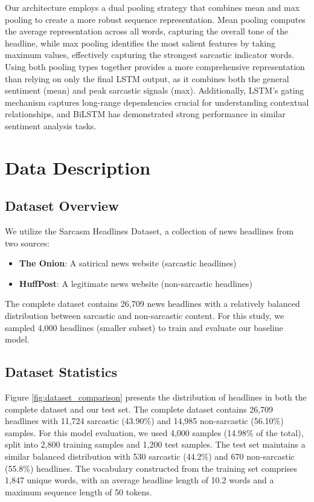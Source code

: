 \documentclass[11pt]{article}
\begin{document}
\noindent Our architecture employs a dual pooling strategy that combines mean and max pooling to create a more robust sequence representation. Mean pooling computes the average representation across all words, capturing the overall tone of the headline, while max pooling identifies the most salient features by taking maximum values, effectively capturing the strongest sarcastic indicator words. Using both pooling types together provides a more comprehensive representation than relying on only the final LSTM output, as it combines both the general sentiment (mean) and peak sarcastic signals (max). Additionally, LSTM's gating mechanism captures long-range dependencies crucial for understanding contextual relationships, and BiLSTM has demonstrated strong performance in similar sentiment analysis tasks.

\section{Data Description}

\subsection{Dataset Overview}
We utilize the Sarcasm Headlines Dataset, a collection of news headlines from two sources:
\begin{itemize}
    \item \textbf{The Onion}: A satirical news website (sarcastic headlines)
    \item \textbf{HuffPost}: A legitimate news website (non-sarcastic headlines)
\end{itemize}

\noindent The complete dataset contains 26,709 news headlines with a relatively balanced distribution between sarcastic and non-sarcastic content. For this study, we sampled 4,000 headlines (smaller subset) to train and evaluate our baseline model.

\subsection{Dataset Statistics}

Figure \ref{fig:dataset_comparison} presents the distribution of headlines in both the complete dataset and our test set. The complete dataset contains 26,709 headlines with 11,724 sarcastic (43.90\%) and 14,985 non-sarcastic (56.10\%) samples. For this model evaluation, we used 4,000 samples (14.98\% of the total), split into 2,800 training samples and 1,200 test samples. The test set maintains a similar balanced distribution with 530 sarcastic (44.2\%) and 670 non-sarcastic (55.8\%) headlines. The vocabulary constructed from the training set comprises 1,847 unique words, with an average headline length of 10.2 words and a maximum sequence length of 50 tokens.
\end{document}
